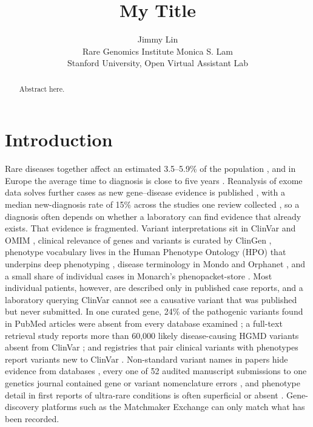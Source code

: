 \documentclass{article} %
\title{My Title}
\author{Jimmy Lin \\
Rare Genomics Institute
\And
Monica S. Lam \\
Stanford University, Open Virtual Assistant Lab
}
\begin{document}
\maketitle

\begin{abstract}
Abstract here.
\end{abstract}

\section{Introduction}
\label{sec:intro}
Rare diseases together affect an estimated 3.5--5.9\% of the population \citep{Wakap2019EstimatingCumulative}, and in Europe the average time to diagnosis is close to five years \citep{Faye2024TimeDiagnosis}. Reanalysis of exome data solves further cases as new gene--disease evidence is published \citep{Wenger2017SystematicReanalysis}, with a median new-diagnosis rate of 15\% across the studies one review collected \citep{Tan2020EvaluatingSystematic}, so a diagnosis often depends on whether a laboratory can find evidence that already exists. That evidence is fragmented. Variant interpretations sit in ClinVar \citep{Landrum2017ClinvarImproving,landrum2025_clinvar} and OMIM \citep{amberger2019_omim,hamosh2021_omim}, clinical relevance of genes and variants is curated by ClinGen \citep{Rehm2015ClingenClinical}, phenotype vocabulary lives in the Human Phenotype Ontology (HPO) \citep{Robinson2008HumanPhenotype,gargano2024_hpo} that underpins deep phenotyping \citep{Robinson2012DeepPhenotyping}, disease terminology in Mondo \citep{vasilevsky2025_mondo} and Orphanet \citep{rath2012_orphanet,lucano2026_orphanet}, and a small share of individual cases in Monarch's phenopacket-store \citep{putman2024_monarch,danis2025_phenopacket_store}. Most individual patients, however, are described only in published case reports, and a laboratory querying ClinVar cannot see a causative variant that was published but never submitted. In one curated gene, 24\% of the pathogenic variants found in PubMed articles were absent from every database examined \citep{Lyons2023RareDisease}; a full-text retrieval study reports more than 60,000 likely disease-causing HGMD variants absent from ClinVar \citep{birgmeier2020_avada}; and registries that pair clinical variants with phenotypes report variants new to ClinVar \citep{Chopra2024ClinicalVariants}. Non-standard variant names in papers hide evidence from databases \citep{freeman2024_vv_literature}, every one of 52 audited manuscript submissions to one genetics journal contained gene or variant nomenclature errors \citep{lansdon2026_nomenclature_errors}, and phenotype detail in first reports of ultra-rare conditions is often superficial or absent \citep{almail2024_reporting_gaps}. Gene-discovery platforms such as the Matchmaker Exchange \citep{philippakis2015_mme} can only match what has been recorded.
\end{document}
